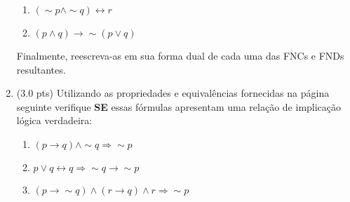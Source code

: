 \documentclass[12pt]{article}
\begin{document}
\begin{enumerate}
\begin{enumerate}
\item $(\sim p \wedge \sim q) \leftrightarrow r$

\item $(p \wedge q) \rightarrow \sim (p \vee q) $

\end{enumerate}

Finalmente, reescreva-as em sua forma dual de cada uma das FNCs 
e FNDs resultantes.


\item (3.0 pts) Utilizando as propriedades e equivalências
fornecidas na página seguinte verifique {\bf SE} 
essas fórmulas apresentam uma relaç\~ao de implicaç\~ao lógica  
verdadeira:

\begin{enumerate}
\setlength{\itemsep}{-2pt}


\item $(p \rightarrow q ) \wedge  \sim  q \Rightarrow \sim p$

\item $p \vee  q  \leftrightarrow q \Rightarrow \sim q \rightarrow \sim p$

\item $(p \rightarrow \sim q)  \wedge (r \rightarrow q) \wedge r \Rightarrow \sim p $










\end{enumerate}


\end{enumerate}
\end{document}
